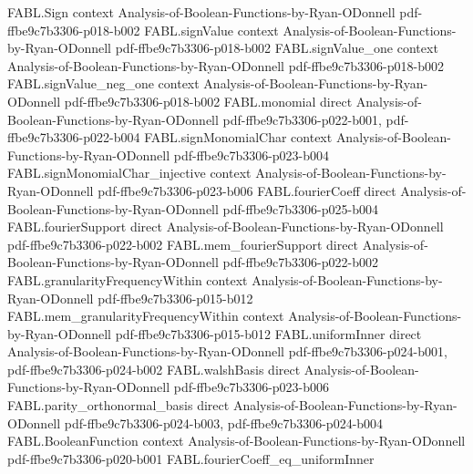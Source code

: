 \begin{theorem}
\label{FABL.fourierCoeff_monomial}
\leanok
{}
\proofstep
  {FABL.Sign}
  {context}
  {Analysis-of-Boolean-Functions-by-Ryan-ODonnell}
  {pdf-ffbe9c7b3306-p018-b002}
\proofstep
  {FABL.signValue}
  {context}
  {Analysis-of-Boolean-Functions-by-Ryan-ODonnell}
  {pdf-ffbe9c7b3306-p018-b002}
\proofstep
  {FABL.signValue_one}
  {context}
  {Analysis-of-Boolean-Functions-by-Ryan-ODonnell}
  {pdf-ffbe9c7b3306-p018-b002}
\proofstep
  {FABL.signValue_neg_one}
  {context}
  {Analysis-of-Boolean-Functions-by-Ryan-ODonnell}
  {pdf-ffbe9c7b3306-p018-b002}
\proofstep
  {FABL.monomial}
  {direct}
  {Analysis-of-Boolean-Functions-by-Ryan-ODonnell}
  {pdf-ffbe9c7b3306-p022-b001,
    pdf-ffbe9c7b3306-p022-b004}
\proofstep
  {FABL.signMonomialChar}
  {context}
  {Analysis-of-Boolean-Functions-by-Ryan-ODonnell}
  {pdf-ffbe9c7b3306-p023-b004}
\proofstep
  {FABL.signMonomialChar_injective}
  {context}
  {Analysis-of-Boolean-Functions-by-Ryan-ODonnell}
  {pdf-ffbe9c7b3306-p023-b006}
\proofstep
  {FABL.fourierCoeff}
  {direct}
  {Analysis-of-Boolean-Functions-by-Ryan-ODonnell}
  {pdf-ffbe9c7b3306-p025-b004}
\proofstep
  {FABL.fourierSupport}
  {direct}
  {Analysis-of-Boolean-Functions-by-Ryan-ODonnell}
  {pdf-ffbe9c7b3306-p022-b002}
\proofstep
  {FABL.mem_fourierSupport}
  {direct}
  {Analysis-of-Boolean-Functions-by-Ryan-ODonnell}
  {pdf-ffbe9c7b3306-p022-b002}
\proofstep
  {FABL.granularityFrequencyWithin}
  {context}
  {Analysis-of-Boolean-Functions-by-Ryan-ODonnell}
  {pdf-ffbe9c7b3306-p015-b012}
\proofstep
  {FABL.mem_granularityFrequencyWithin}
  {context}
  {Analysis-of-Boolean-Functions-by-Ryan-ODonnell}
  {pdf-ffbe9c7b3306-p015-b012}
\proofstep
  {FABL.uniformInner}
  {direct}
  {Analysis-of-Boolean-Functions-by-Ryan-ODonnell}
  {pdf-ffbe9c7b3306-p024-b001,
    pdf-ffbe9c7b3306-p024-b002}
\proofstep
  {FABL.walshBasis}
  {direct}
  {Analysis-of-Boolean-Functions-by-Ryan-ODonnell}
  {pdf-ffbe9c7b3306-p023-b006}
\proofstep
  {FABL.parity_orthonormal_basis}
  {direct}
  {Analysis-of-Boolean-Functions-by-Ryan-ODonnell}
  {pdf-ffbe9c7b3306-p024-b003,
    pdf-ffbe9c7b3306-p024-b004}
\proofstep
  {FABL.BooleanFunction}
  {context}
  {Analysis-of-Boolean-Functions-by-Ryan-ODonnell}
  {pdf-ffbe9c7b3306-p020-b001}
\proofstep
  {FABL.fourierCoeff_eq_uniformInner}

\end{theorem}
